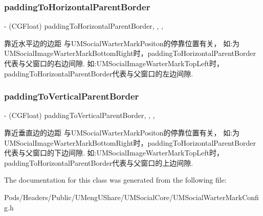 \subsubsection{\texorpdfstring{padding\+To\+Horizontal\+Parent\+Border}{paddingToHorizontalParentBorder}}
{\footnotesize\ttfamily -\/ (C\+G\+Float) padding\+To\+Horizontal\+Parent\+Border\hspace{0.3cm}{\ttfamily [read]}, {\ttfamily [write]}, {\ttfamily [nonatomic]}, {\ttfamily [assign]}}

靠近水平边的边距 与\+U\+M\+Social\+Warter\+Mark\+Positon的停靠位置有关， 如\+:为\+U\+M\+Social\+Image\+Warter\+Mark\+Bottom\+Right时，padding\+To\+Horizontal\+Parent\+Border代表与父窗口的右边间隙. 如\+:U\+M\+Social\+Image\+Warter\+Mark\+Top\+Left时，padding\+To\+Horizontal\+Parent\+Border代表与父窗口的左边间隙. \mbox{\label{interface_u_m_social_image_warter_mark_config_af587deea8e1bf9abeb6c9f8bb6722ec8}} 
\subsubsection{\texorpdfstring{padding\+To\+Vertical\+Parent\+Border}{paddingToVerticalParentBorder}}
{\footnotesize\ttfamily -\/ (C\+G\+Float) padding\+To\+Vertical\+Parent\+Border\hspace{0.3cm}{\ttfamily [read]}, {\ttfamily [write]}, {\ttfamily [nonatomic]}, {\ttfamily [assign]}}

靠近垂直边的边距 与\+U\+M\+Social\+Warter\+Mark\+Positon的停靠位置有关， 如\+:为\+U\+M\+Social\+Image\+Warter\+Mark\+Bottom\+Right时，padding\+To\+Horizontal\+Parent\+Border代表与父窗口的下边间隙. 如\+:U\+M\+Social\+Image\+Warter\+Mark\+Top\+Left时，padding\+To\+Horizontal\+Parent\+Border代表与父窗口的上边间隙. 

The documentation for this class was generated from the following file\+:\begin{DoxyCompactItemize}
\item 
Pods/\+Headers/\+Public/\+U\+Meng\+U\+Share/\+U\+M\+Social\+Core/U\+M\+Social\+Warter\+Mark\+Config.\+h\end{DoxyCompactItemize}
